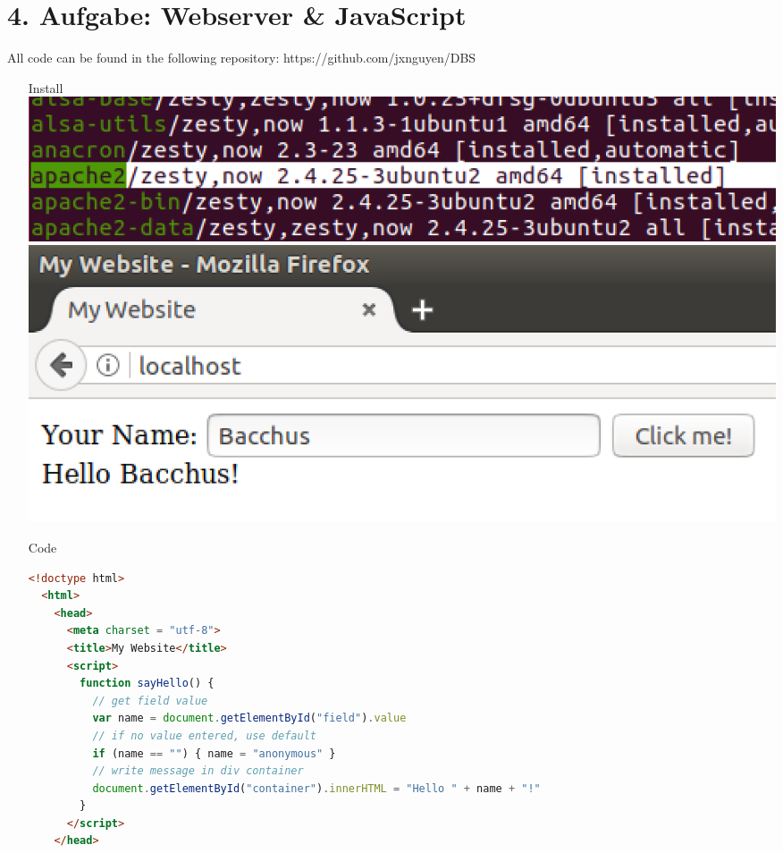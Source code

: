 \documentclass[12pt]{report}
\begin{document}
\newpage

\section*{4. Aufgabe: Webserver \& JavaScript}

All code can be found in the following repository: https://github.com/jxnguyen/DBS\\

\begin{enumerate}
\item[Install]
\includegraphics[scale = 0.5]{apache}\\
\includegraphics[scale = 0.5]{localhost}\\

\item[Code]
\begin{lstlisting}[language = html, breaklines = true]
  <!doctype html>
  <html>
    <head>
      <meta charset = "utf-8">
      <title>My Website</title>
      <script>
        function sayHello() {
          // get field value
          var name = document.getElementById("field").value
          // if no value entered, use default
          if (name == "") { name = "anonymous" }
          // write message in div container
          document.getElementById("container").innerHTML = "Hello " + name + "!"
        }
      </script>
    </head>


\end{lstlisting}
\end{enumerate}
\end{document}
